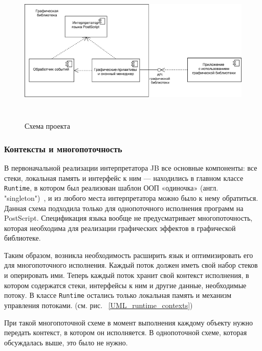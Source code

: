 \documentclass[14pt]{extarticle}
\begin{document}
	\begin{figure} [h]
			\includegraphics[height=200pt]{Project_scheme.png}
			\caption{Схема проекта}\label{project_scheme}
	\end{figure}

	\subsubsection*{Контексты и многопоточность}
	В первоначальной реализации интерпретатора JB все основные компоненты: все стеки, локальная память и интерфейс к ним --- находились в главном классе \texttt{Runtime}, в котором был реализован шаблон ООП «одиночка» (англ. "singleton")~\cite{patterns}, и из любого места интерпретатора можно было к нему обратиться. Данная схема подходила только для однопоточного исполнения программ на PostScript. Спецификация языка вообще не предусматривает многопоточность, которая необходима для реализации графических эффектов в графической библиотеке.
		
	Таким образом, возникла необходимость расширить язык и оптимизировать его для многопоточного исполнения. Каждый поток должен иметь свой набор стеков и оперировать ими. Теперь каждый поток хранит свой контекст исполнения, в котором  содержатся стеки, интерфейсы к ним и другие данные, необходимые потоку. В классе \texttt{Runtime}  остались только локальная память и механизм управления потоками. (см. рис. ~\ref{UML_runtime_contexts}) 
		
	При такой многопоточной схеме в момент выполнения  каждому объекту нужно передать контекст, в котором он исполняется. В однопоточной схеме, которая обсуждалась выше, это было не нужно.
		
		
\end{document}
